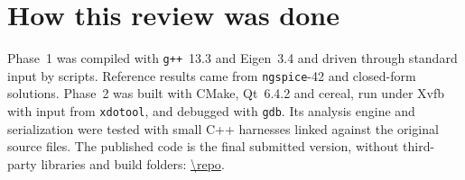 \section*{How this review was done}
Phase~1 was compiled with \texttt{g++}~13.3 and Eigen~3.4 and driven through standard input by scripts.
Reference results came from \texttt{ngspice}-42 and closed-form solutions. Phase~2 was built with CMake, Qt~6.4.2
and cereal, run under Xvfb with input from \texttt{xdotool}, and debugged with \texttt{gdb}. Its analysis engine
and serialization were tested with small C++ harnesses linked against the original source files. The published
code is the final submitted version, without third-party libraries and build folders: \url{\repo}.


